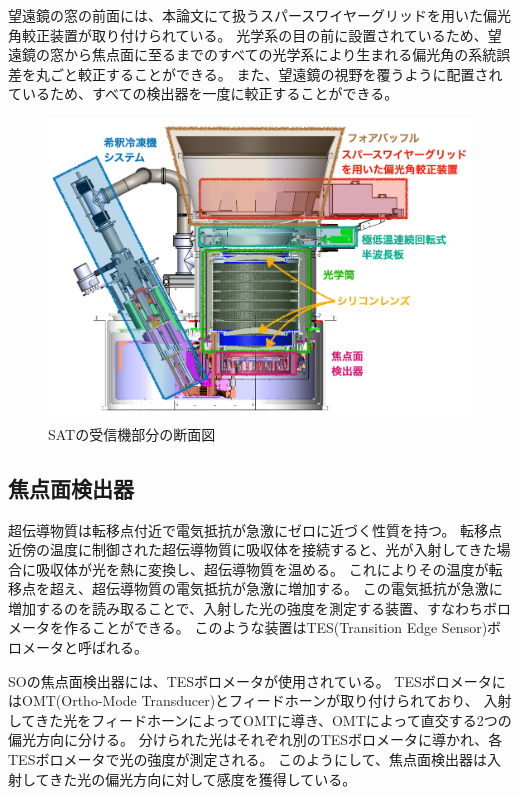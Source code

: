 \documentclass[../../main.tex]{subfiles}
\begin{document}
望遠鏡の窓の前面には、本論文にて扱うスパースワイヤーグリッドを用いた偏光角較正装置が取り付けられている。
光学系の目の前に設置されているため、望遠鏡の窓から焦点面に至るまでのすべての光学系により生まれる偏光角の系統誤差を丸ごと較正することができる。
また、望遠鏡の視野を覆うように配置されているため、すべての検出器を一度に較正することができる。
\begin{figure}[H]
    \centering
    \includegraphics[width=1.0\textwidth]{simons_observatory/sat_danmen.pdf}
    \caption{SATの受信機部分の断面図}
    \label{fig:so-sat}
\end{figure}

\subsection{焦点面検出器}
超伝導物質は転移点付近で電気抵抗が急激にゼロに近づく性質を持つ。
転移点近傍の温度に制御された超伝導物質に吸収体を接続すると、光が入射してきた場合に吸収体が光を熱に変換し、超伝導物質を温める。
これによりその温度が転移点を超え、超伝導物質の電気抵抗が急激に増加する。
この電気抵抗が急激に増加するのを読み取ることで、入射した光の強度を測定する装置、すなわちボロメータを作ることができる。
このような装置はTES(Transition Edge Sensor)ボロメータと呼ばれる。

SOの焦点面検出器には、TESボロメータが使用されている。
TESボロメータにはOMT(Ortho-Mode Transducer)とフィードホーンが取り付けられており、
入射してきた光をフィードホーンによってOMTに導き、OMTによって直交する2つの偏光方向に分ける\cite{duff2024simonsobservatoryproductionlevelfabrication}。
分けられた光はそれぞれ別のTESボロメータに導かれ、各TESボロメータで光の強度が測定される。
このようにして、焦点面検出器は入射してきた光の偏光方向に対して感度を獲得している。
\end{document}
